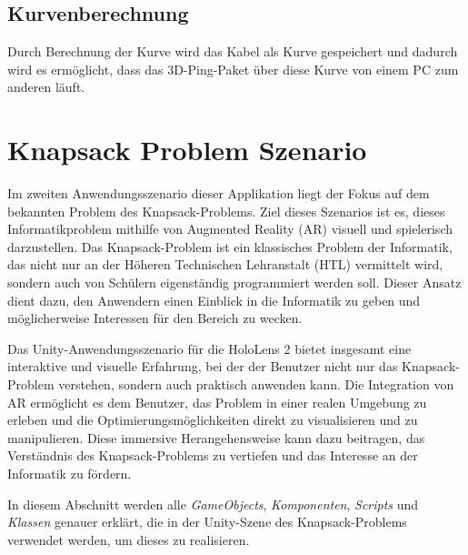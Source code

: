 \subsection{Kurvenberechnung}
Durch Berechnung der Kurve wird das Kabel als Kurve gespeichert
und dadurch wird es ermöglicht, dass das 3D-Ping-Paket über diese
Kurve von einem PC zum anderen läuft.

\section{Knapsack Problem Szenario} 
Im zweiten Anwendungsszenario dieser Applikation liegt der Fokus auf dem bekannten Problem des Knapsack-Problems. Ziel
dieses Szenarios ist es, dieses Informatikproblem mithilfe von Augmented Reality (AR) visuell und spielerisch darzustellen.
Das Knapsack-Problem ist ein klassisches Problem der Informatik, das nicht nur an der Höheren Technischen Lehranstalt (HTL)
vermittelt wird, sondern auch von Schülern eigenständig programmiert werden soll. Dieser Ansatz dient dazu, den Anwendern
einen Einblick in die Informatik zu geben und möglicherweise Interessen für den Bereich zu wecken.

Das Unity-Anwendungsszenario für die HoloLens 2 bietet insgesamt eine interaktive und visuelle Erfahrung, bei der der
Benutzer nicht nur das Knapsack-Problem verstehen, sondern auch praktisch anwenden kann. Die Integration von AR ermöglicht
es dem Benutzer, das Problem in einer realen Umgebung zu erleben und die Optimierungsmöglichkeiten direkt zu visualisieren
und zu manipulieren. Diese immersive Herangehensweise kann dazu beitragen, das Verständnis des Knapsack-Problems zu vertiefen
und das Interesse an der Informatik zu fördern.

In diesem Abschnitt werden alle \textit{GameObjects}, \textit{Komponenten}, \textit{Scripts} und \textit{Klassen} genauer
erklärt, die in der Unity-Szene des Knapsack-Problems verwendet werden, um dieses zu realisieren.

